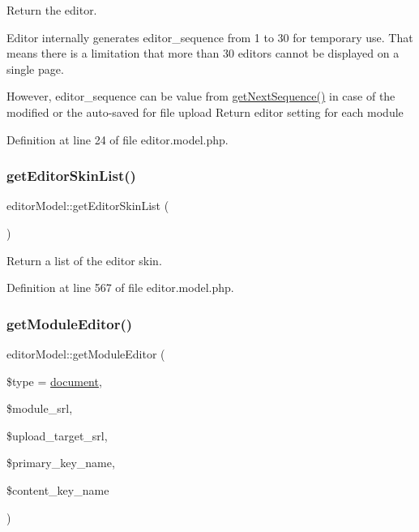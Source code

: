 Return the editor. 

Editor internally generates editor\+\_\+sequence from 1 to 30 for temporary use. That means there is a limitation that more than 30 editors cannot be displayed on a single page.

However, editor\+\_\+sequence can be value from \hyperlink{func_8inc_8php_a5a97b458f9c5b4fe3574671840aee27c}{get\+Next\+Sequence()} in case of the modified or the auto-\/saved for file upload Return editor setting for each module 

Definition at line 24 of file editor.\+model.\+php.

\mbox{\label{classeditorModel_ae67ee69d58776938a04d14d0df5284ff}} 
\subsubsection{\texorpdfstring{get\+Editor\+Skin\+List()}{getEditorSkinList()}}
{\footnotesize\ttfamily editor\+Model\+::get\+Editor\+Skin\+List (\begin{DoxyParamCaption}{ }\end{DoxyParamCaption})}



Return a list of the editor skin. 



Definition at line 567 of file editor.\+model.\+php.

\mbox{\label{classeditorModel_af2b57078eb05b65c0094d5dac0186ca5}} 
\subsubsection{\texorpdfstring{get\+Module\+Editor()}{getModuleEditor()}}
{\footnotesize\ttfamily editor\+Model\+::get\+Module\+Editor (\begin{DoxyParamCaption}\item[{}]{\$type = {\ttfamily \textquotesingle{}\hyperlink{classdocument}{document}\textquotesingle{}},  }\item[{}]{\$module\+\_\+srl,  }\item[{}]{\$upload\+\_\+target\+\_\+srl,  }\item[{}]{\$primary\+\_\+key\+\_\+name,  }\item[{}]{\$content\+\_\+key\+\_\+name }\end{DoxyParamCaption})}



